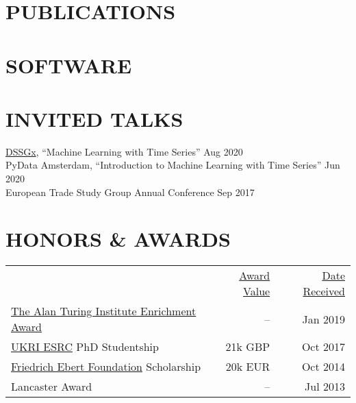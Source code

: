 \documentclass{cv}
\newcommand{\printbibsection}[2]{
\begin{refsection}
\nocite{*}
\printbibliography[sorting=chronological,
                  type={#1},
                  title={#2},
                  heading=none]
\end{refsection}
}
\begin{document}
\section{PUBLICATIONS}
\printbibsection{article}{}

\section{SOFTWARE}
\printbibsection{misc}{}

\section{INVITED TALKS}

\href{https://www.datascienceforsocialgood.org}{DSSGx}, ``Machine Learning with Time Series'' \hfill Aug 2020 \\

PyData Amsterdam, ``Introduction to Machine Learning with Time Series'' \hfill Jun 2020 \\

European Trade Study Group Annual Conference \hfill Sep 2017 \\

\section{HONORS \& AWARDS}

\noindent
\begin{tabularx}{\textwidth}{@{}lrr}
& \underline{Award Value} & \underline{Date Received} \\
\href{https://www.turing.ac.uk/work-turing/studentships/enrichment}{The Alan Turing Institute Enrichment Award} & -- & Jan 2019 \\
\href{https://esrc.ukri.org}{UKRI ESRC} PhD Studentship & 21k GBP & Oct 2017 \\
\href{https://www.fes.de}{Friedrich Ebert Foundation} Scholarship & 20k EUR & Oct 2014 \\
Lancaster Award & -- & Jul 2013 \\
\end{tabularx}


\end{document}
